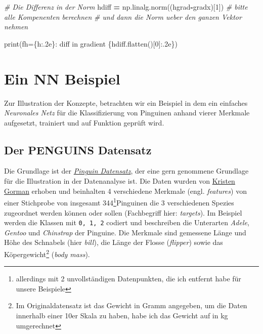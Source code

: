 \documentclass[
]{book}
\newenvironment{Shaded}{\begin{snugshade}}{\end{snugshade}}
\newcommand{\BuiltInTok}[1]{#1}
\newcommand{\CommentTok}[1]{\textcolor[rgb]{0.56,0.35,0.01}{\textit{#1}}}
\newcommand{\DecValTok}[1]{\textcolor[rgb]{0.00,0.00,0.81}{#1}}
\newcommand{\NormalTok}[1]{#1}
\newcommand{\OperatorTok}[1]{\textcolor[rgb]{0.81,0.36,0.00}{\textbf{#1}}}
\newcommand{\SpecialCharTok}[1]{\textcolor[rgb]{0.00,0.00,0.00}{#1}}
\newcommand{\SpecialStringTok}[1]{\textcolor[rgb]{0.31,0.60,0.02}{#1}}
\theoremstyle{definition}
\theoremstyle{definition}
\theoremstyle{definition}
\theoremstyle{definition}
\theoremstyle{remark}
\begin{document}
\begin{Shaded}
\begin{Highlighting}[]
\CommentTok{\# Die Differenz in der Norm}
\NormalTok{hdiff }\OperatorTok{=}\NormalTok{ np.linalg.norm((hgrad}\OperatorTok{{-}}\NormalTok{gradx)[}\DecValTok{1}\NormalTok{])}
\CommentTok{\# bitte alle Kompenenten berechnen}
\CommentTok{\# und dann die Norm ueber den ganzen Vektor nehmen}

\BuiltInTok{print}\NormalTok{(}\SpecialStringTok{f\textquotesingle{}h=}\SpecialCharTok{\{h:.2e\}}\SpecialStringTok{: diff in gradient }\SpecialCharTok{\{}\NormalTok{hdiff}\SpecialCharTok{.}\NormalTok{flatten()[}\DecValTok{0}\NormalTok{]}\SpecialCharTok{:.2e\}}\SpecialStringTok{\textquotesingle{}}\NormalTok{)}
\end{Highlighting}
\end{Shaded}

\hypertarget{ein-nn-beispiel}{%
\chapter{Ein NN Beispiel}\label{ein-nn-beispiel}}

Zur Illustration der Konzepte, betrachten wir ein Beispiel in dem ein einfaches
\emph{Neuronales Netz} für die Klassifizierung von Pinguinen anhand vierer
Merkmale aufgesetzt, trainiert und auf Funktion geprüft wird.

\hypertarget{der-penguins-datensatz}{%
\section{Der PENGUINS Datensatz}\label{der-penguins-datensatz}}

Die Grundlage ist der \href{https://allisonhorst.github.io/palmerpenguins/}{\emph{Pinguin Datensatz}}, der eine gern genommene Grundlage für die Illustration in der Datenanalyse ist. Die Daten wurden von \href{https://www.uaf.edu/cfos/people/faculty/detail/kristen-gorman.php}{Kristen Gorman} erhoben und beinhalten 4 verschiedene Merkmale (engl. \emph{features}) von einer Stichprobe von insgesamt 344\footnote{allerdings mit 2 unvollständigen Datenpunkten, die ich entfernt habe für unsere Beispiele}Pinguinen die 3 verschiedenen Spezies zugeordnet werden können oder sollen (Fachbegriff hier: \emph{targets}). Im Beispiel werden die Klassen mit \texttt{0,\ 1,\ 2} codiert und beschreiben die Unterarten \emph{Adele}, \emph{Gentoo} und \emph{Chinstrap} der Pinguine. Die Merkmale sind gemessene Länge und Höhe des Schnabels (hier \emph{bill}), die Länge der Flosse (\emph{flipper}) sowie das Köpergewicht\footnote{Im Originaldatensatz ist das Gewicht in Gramm angegeben, um die Daten innerhalb einer 10er Skala zu haben, habe ich das Gewicht auf in kg umgerechnet}
(\emph{body mass}).
\end{document}

